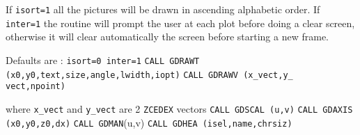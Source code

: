 If {\tt isort=1} all the pictures will be drawn in
ascending alphabetic order.
If {\tt inter=1} the routine will prompt the user at each plot
before doing a clear screen, otherwise it will
clear automatically the screen before starting a new frame.
 
Defaults are : {\tt isort=0 inter=1}
{\tt CALL GDRAWT (x0,y0,text,size,angle,lwidth,iopt)}
{\tt CALL GDRAWV (x\_vect,y\_ vect,npoint)}
 
where {\tt x\_vect} and {\tt y\_vect} are 2 {\tt ZCEDEX} vectors
{\tt CALL GDSCAL (u,v)}
{\tt CALL GDAXIS (x0,y0,z0,dx)}
{\tt CALL GDMAN}(u,v)
{\tt CALL GDHEA (isel,name,chrsiz)}
 
